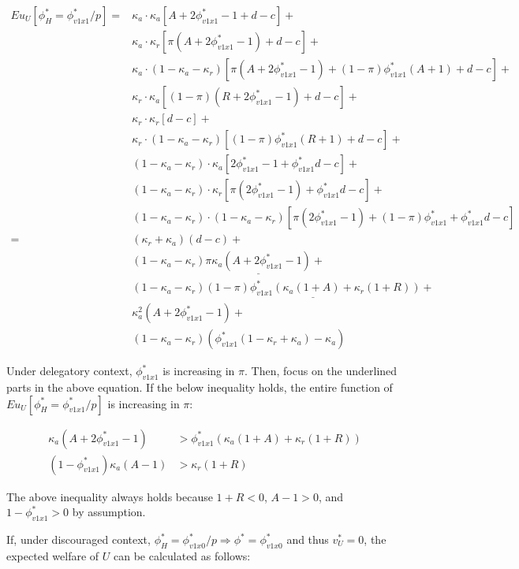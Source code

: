 \begin{align*}
	Eu_U[\phi^*_H = \phi^*_{v1x1}/p] =& \kappa_a \cdot \kappa_a [ A + 2\phi^*_{v1x1} - 1 + d - c] + \\
	&\kappa_a \cdot \kappa_r [ \pi(A+2\phi^*_{v1x1}-1) + d - c] + \\
	&\kappa_a \cdot (1-\kappa_a-\kappa_r) [ \pi(A+2\phi^*_{v1x1}-1) + (1-\pi)\phi^*_{v1x1}(A+1) + d - c] + \\
	&\kappa_r \cdot \kappa_a [ (1-\pi)(R+2\phi^*_{v1x1}-1) + d - c] + \\
	&\kappa_r \cdot \kappa_r [ d - c ] + \\
	&\kappa_r \cdot (1-\kappa_a-\kappa_r) [ (1-\pi)\phi^*_{v1x1}(R+1) + d - c] + \\
	&(1-\kappa_a-\kappa_r) \cdot \kappa_a [ 2\phi^*_{v1x1}-1 + \phi^*_{v1x1} d - c] + \\
	&(1-\kappa_a-\kappa_r) \cdot \kappa_r [ \pi (2\phi^*_{v1x1}-1) + \phi^*_{v1x1} d - c] + \\
	&(1-\kappa_a-\kappa_r) \cdot (1-\kappa_a-\kappa_r) [ \pi (2\phi^*_{v1x1}-1)+ (1-\pi)\phi^*_{v1x1} + \phi^*_{v1x1} d - c ] \\
	=& (\kappa_r+\kappa_a)(d-c) + \\
	&(1-\kappa_a-\kappa_r)\underline{\pi\kappa_a(A+2\phi^*_{v1x1}-1)}+\\
	&(1-\kappa_a-\kappa_r)\underline{(1-\pi)\phi^*_{v1x1}(\kappa_a(1+A)+\kappa_r(1+R))} + \\
	&\kappa_a^2(A+2\phi^*_{v1x1}-1) + \\
	&(1-\kappa_a-\kappa_r)(\phi^*_{v1x1}(1-\kappa_r+\kappa_a)-\kappa_a)
\end{align*}

\noindent Under delegatory context, $\phi^*_{v1x1}$ is increasing in $\pi$. Then, focus on the underlined parts in the above equation. If the below inequality holds, the entire function of $Eu_U[\phi^*_H = \phi^*_{v1x1}/p]$ is increasing in $\pi$: 

\begin{align*}
	\kappa_a(A+2\phi^*_{v1x1}-1) &> \phi^*_{v1x1}(\kappa_a(1+A)+\kappa_r(1+R))\\
	(1-\phi^*_{v1x1})\kappa_a(A-1) &> \kappa_r(1+R)
\end{align*}

\noindent The above inequality always holds because $1+R<0$, $A-1>0$, and $1-\phi^*_{v1x1}>0$ by assumption. 

\par If, under discouraged context, $\phi^*_H = \phi^*_{v1x0}/p \Rightarrow \phi^* = \phi^*_{v1x0}$ and thus $v^*_U=0$, the expected welfare of $U$ can be calculated as follows:

